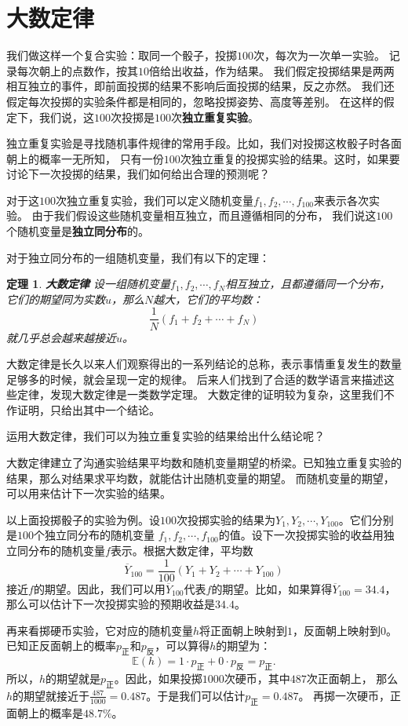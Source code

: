 \documentclass[12pt,UTF8]{ctexbook}
\newtheorem{tm}{定理}[section]
\begin{document}
\section{大数定律}

我们做这样一个复合实验：取同一个骰子，投掷$100$次，每次为一次单一实验。
记录每次朝上的点数作，按其$10$倍给出收益，作为结果。
我们假定投掷结果是两两相互独立的事件，即前面投掷的结果不影响后面投掷的结果，反之亦然。
我们还假定每次投掷的实验条件都是相同的，忽略投掷姿势、高度等差别。
在这样的假定下，我们说，这$100$次投掷是$100$次\textbf{独立重复实验}。

独立重复实验是寻找随机事件规律的常用手段。比如，我们对投掷这枚骰子时各面朝上的概率一无所知，
只有一份$100$次独立重复的投掷实验的结果。这时，如果要讨论下一次投掷的结果，我们如何给出合理的预测呢？

对于这$100$次独立重复实验，我们可以定义随机变量$f_1,f_2,\cdots , f_{100}$来表示各次实验。
由于我们假设这些随机变量相互独立，而且遵循相同的分布，
我们说这$100$个随机变量是\textbf{独立同分布}的。

对于独立同分布的一组随机变量，我们有以下的定理：
\begin{tm}\textbf{大数定律}
    设一组随机变量$f_1, f_2, \cdots, f_{N}$相互独立，且都遵循同一个分布，
    它们的期望同为实数$u$，那么$N$越大，它们的平均数：
    $$\frac{1}{N}\left(f_1 + f_2 + \cdots + f_{N}\right)$$
    就几乎总会越来越接近$u$。
\end{tm}

大数定律是长久以来人们观察得出的一系列结论的总称，表示事情重复发生的数量足够多的时候，就会呈现一定的规律。
后来人们找到了合适的数学语言来描述这些定律，发现大数定律是一类数学定理。
大数定律的证明较为复杂，这里我们不作证明，只给出其中一个结论。

运用大数定律，我们可以为独立重复实验的结果给出什么结论呢？

大数定律建立了沟通实验结果平均数和随机变量期望的桥梁。已知独立重复实验的结果，那么对结果求平均数，就能估计出随机变量的期望。
而随机变量的期望，可以用来估计下一次实验的结果。

以上面投掷骰子的实验为例。设$100$次投掷实验的结果为$Y_1, Y_2, \cdots , Y_{100}$。它们分别是$100$个独立同分布的随机变量
$f_1, f_2, \cdots, f_{100}$的值。设下一次投掷实验的收益用独立同分布的随机变量$f$表示。根据大数定律，平均数
$$\overline{Y}_{100} = \frac{1}{100}(Y_1 + Y_2 + \cdots + Y_{100})$$
接近$f$的期望。因此，我们可以用$\overline{Y}_{100}$代表$f$的期望。比如，如果算得$\overline{Y}_{100} = 34.4$，
那么可以估计下一次投掷实验的预期收益是$34.4$。

再来看掷硬币实验，它对应的随机变量$h$将正面朝上映射到$1$，反面朝上映射到$0$。
已知正反面朝上的概率$p_{\text{正}}$和$p_{\text{反}}$，可以算得$h$的期望为：
$$ \mathbb{E}(h) = 1 \cdot p_{\text{正}} + 0 \cdot p_{\text{反}} = p_{\text{正}}.$$
所以，$h$的期望就是$p_{\text{正}}$。因此，如果投掷$1000$次硬币，其中$487$次正面朝上，
那么$h$的期望就接近于$\frac{487}{1000} = 0.487$。于是我们可以估计$p_{\text{正}} = 0.487$。
再掷一次硬币，正面朝上的概率是$48.7\%$。
\end{document}
